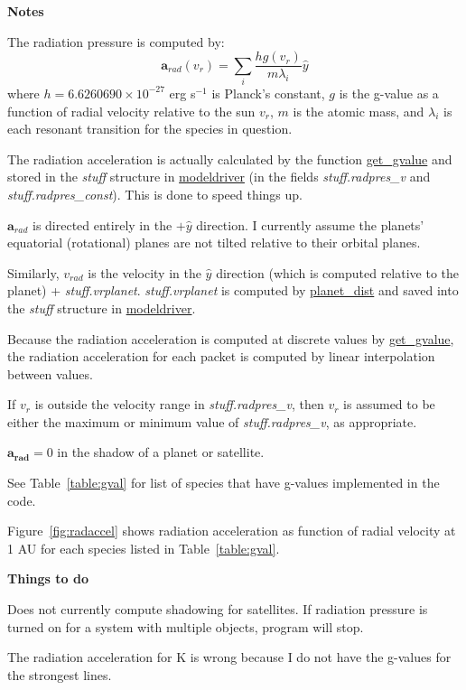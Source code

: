 \documentclass[11pt]{article}
\newcommand\descrip[1]{\textsf{\textbf{\large{#1}}}\\}
\begin{document}
\descrip{Notes}
\begin{compactenum}
\item The radiation pressure is computed by:
\begin{equation}
\mathbf{a}_{rad}(v_r) = \sum_i \frac{h g(v_r)}{m \lambda_i} \hat{y}
\end{equation}
where $h=6.6260690\times10^{-27}$ erg s$^{-1}$ is Planck's constant, $g$ is the
g-value as a function of radial velocity relative to the sun $v_r$, $m$ is the
atomic mass, and
$\lambda_i$ is each resonant transition for the species in question.
\item The radiation acceleration is actually calculated by the function
\hyperref[sec:get_gvalue]{get\_gvalue} and stored in the \textit{stuff}
structure in \hyperref[sec:modeldriver]{modeldriver} (in the fields
\textit{stuff.radpres\_v} and \textit{stuff.radpres\_const}). This is done to
speed things up.
\item $\mathbf{a}_{rad}$ is directed entirely in the $+\hat{y}$ direction. I
currently assume the planets' equatorial (rotational) planes are not tilted
relative to their orbital planes.
\item Similarly, $v_{rad}$ is the velocity in the $\hat{y}$ direction (which is
computed relative to the planet) + \textit{stuff.vrplanet}.
\textit{stuff.vrplanet} is computed by \hyperref[sec:planet_dist]{planet\_dist}
and saved into the \textit{stuff} structure in
\hyperref[sec:modeldriver]{modeldriver}.
\item Because the radiation acceleration is computed at discrete values by
\hyperref[sec:get_gvalue]{get\_gvalue}, the radiation acceleration for each
packet is computed by linear interpolation between values.
\item If $v_r$ is outside the velocity range in \textit{stuff.radpres\_v},
then $v_r$ is assumed to be either the maximum or minimum value of
\textit{stuff.radpres\_v}, as appropriate.
\item $\mathbf{a_{rad}} = 0$ in the shadow of a planet or satellite.
\item See Table~\ref{table:gval} for list of species that have g-values
implemented in the code.
\item Figure~\ref{fig:radaccel} shows radiation acceleration as function of
radial velocity at 1 AU for each species listed in Table~\ref{table:gval}.
\end{compactenum}

\descrip{Things to do}
\begin{compactenum} \listup
\item Does not currently compute shadowing for satellites. If radiation
pressure is turned on for a system with multiple objects, program will stop.
\item The radiation acceleration for K is wrong because I do not have the
g-values for the strongest lines.
\end{compactenum}
\end{document}
